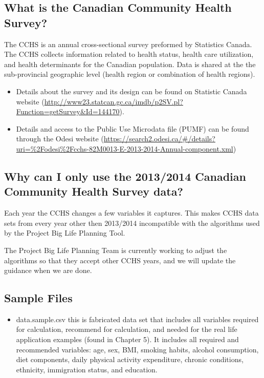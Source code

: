 \documentclass[]{book}
\providecommand{\tightlist}{%
  \setlength{\itemsep}{0pt}\setlength{\parskip}{0pt}}
\begin{document}
\subsection{What is the Canadian Community Health
Survey?}\label{what-is-the-canadian-community-health-survey}

The CCHS is an annual cross-sectional survey preformed by Statistics
Canada. The CCHS collects information related to health status, health
care utilization, and health determinants for the Canadian population.
Data is shared at the the sub-provincial geographic level (health region
or combination of health regions).

\begin{itemize}
\tightlist
\item
  Details about the survey and its design can be found on Statistic
  Canada website
  (\url{http://www23.statcan.gc.ca/imdb/p2SV.pl?Function=getSurvey\&Id=144170}).
\item
  Details and access to the Public Use Microdata file (PUMF) can be
  found through the Odesi website
  (\url{https://search2.odesi.ca/\#/details?uri=\%2Fodesi\%2Fcchs-82M0013-E-2013-2014-Annual-component.xml})
\end{itemize}

\subsection{Why can I only use the 2013/2014 Canadian Community Health
Survey
data?}\label{why-can-i-only-use-the-20132014-canadian-community-health-survey-data}

Each year the CCHS changes a few variables it captures. This makes CCHS
data sets from every year other then 2013/2014 incompatible with the
algorithms used by the Project Big Life Planning Tool.

The Project Big Life Planning Team is currently working to adjust the
algorithms so that they accept other CCHS years, and we will update the
guidance when we are done.

\subsection{Sample Files}\label{sample-files}

\begin{itemize}
\tightlist
\item
  data.sample.csv this is fabricated data set that includes all
  variables required for calculation, recommend for calculation, and
  needed for the real life application examples (found in Chapter 5). It
  includes all required and recommended variables: age, sex, BMI,
  smoking habits, alcohol consumption, diet components, daily physical
  activity expenditure, chronic conditions, ethnicity, immigration
  status, and education.
\end{itemize}
\end{document}
